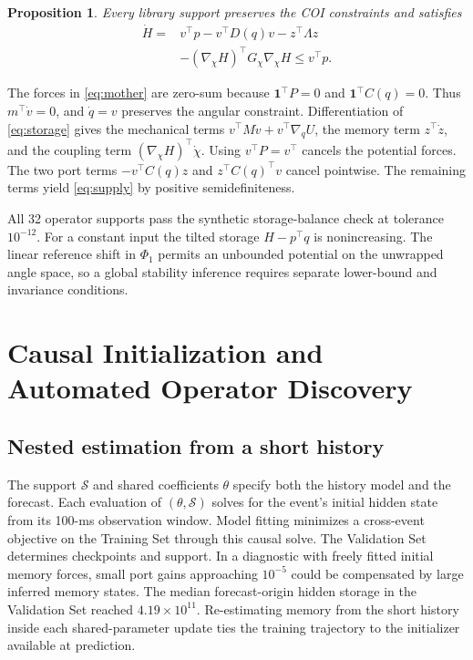 \documentclass[journal]{IEEEtran}
\newtheorem{proposition}{Proposition}
\begin{document}
\begin{proposition}
Every library support preserves the COI constraints and satisfies
\begin{equation}
 \begin{split}
 \dot H={}&v^\top p-v^\top D(q)v-z^\top\Lambda z\\
           &-(\nabla_\chi H)^\top G_\chi\nabla_\chi H
           \le v^\top p.
 \end{split}
 \label{eq:supply}
\end{equation}
\end{proposition}
\begin{IEEEproof}
The forces in \eqref{eq:mother} are zero-sum because
\(\mathbf{1}^\top P=0\) and \(\mathbf{1}^\top C(q)=0\). Thus
\(m^\top\dot v=0\), and \(\dot q=v\) preserves the angular constraint.
Differentiation of \eqref{eq:storage} gives the mechanical terms
\(v^\top M\dot v+v^\top\nabla_q U\), the memory term \(z^\top\dot z\), and
the coupling term \((\nabla_\chi H)^\top\dot\chi\).
Using \(v^\top P=v^\top\) cancels the potential forces. The two port terms
\(-v^\top C(q)z\) and \(z^\top C(q)^\top v\) cancel pointwise.
The remaining terms yield \eqref{eq:supply} by positive semidefiniteness.
\end{IEEEproof}

All 32 operator supports pass the synthetic storage-balance check
at tolerance \(10^{-12}\). For a constant input the tilted storage
\(H-p^\top q\) is nonincreasing. The linear reference shift in \(\Phi_1\)
permits an unbounded potential on the unwrapped angle space, so a global
stability inference requires separate lower-bound and invariance conditions.


\section{Causal Initialization and Automated Operator Discovery}
\label{sec:discovery}
\subsection{Nested estimation from a short history}
The support \(\mathcal S\) and shared coefficients \(\theta\) specify
both the history model and the forecast. Each evaluation of \((\theta,\mathcal
S)\) solves for the event's initial hidden state from its 100-ms observation
window. Model fitting minimizes a cross-event objective on the Training Set
through this causal solve. The Validation Set determines checkpoints and
support. In a diagnostic with freely fitted initial memory forces, small
port gains approaching \(10^{-5}\) could be compensated by large inferred
memory states. The median forecast-origin hidden storage in the Validation
Set reached \(4.19\times10^{11}\). Re-estimating memory from the short
history inside each shared-parameter update ties the training trajectory to
the initializer available at prediction.
\end{document}

